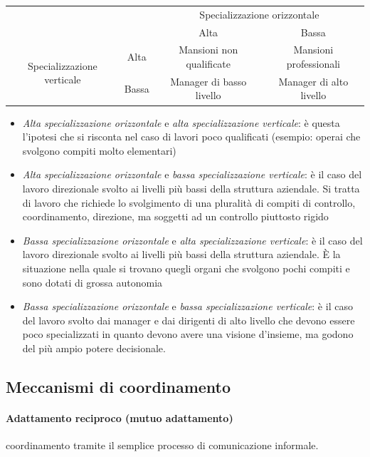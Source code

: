 \begin{table}[h]
	\begin{tabular}{cc|c|c|}
		\cline{3-4}
		&       & \multicolumn{2}{c|}{Specializzazione orizzontale}  \\ \cline{3-4} 
		&       & Alta                     & Bassa                   \\ \hline
		\multicolumn{1}{|c|}{\multirow{2}{*}{Specializzazione verticale}} & Alta  & Mansioni non qualificate & Mansioni professionali  \\ \cline{2-4} 
		\multicolumn{1}{|c|}{}                                            & Bassa & Manager di basso livello & Manager di alto livello \\ \hline
	\end{tabular}
\end{table}
\begin{itemize}
	\item \emph{Alta specializzazione orizzontale} e \emph{alta specializzazione verticale}:
	è questa l’ipotesi che si risconta nel caso di lavori poco qualificati
	(esempio: operai che svolgono compiti molto elementari)
	
	\item \emph{Alta specializzazione orizzontale} e \emph{bassa specializzazione
	verticale}: è il caso del lavoro direzionale svolto ai livelli più bassi della
	struttura aziendale. Si tratta di
	lavoro che richiede lo svolgimento di una pluralità di compiti di
	controllo, coordinamento, direzione, ma soggetti ad un controllo
	piuttosto rigido
	\item \emph{Bassa specializzazione orizzontale} e \emph{alta specializzazione
	verticale}: è il caso del lavoro direzionale svolto ai livelli più bassi della
	struttura aziendale. È la situazione nella quale si trovano quegli
	organi che svolgono pochi compiti e sono dotati di grossa autonomia
	\item \emph{Bassa specializzazione orizzontale} e \emph{bassa specializzazione
	verticale}: è il caso del lavoro svolto dai manager e dai dirigenti di alto
	livello che devono essere poco specializzati in quanto devono avere
	una visione d’insieme, ma godono del più ampio potere decisionale.
\end{itemize}

\subsection{Meccanismi di coordinamento}
\paragraph{Adattamento reciproco (mutuo adattamento)}
coordinamento tramite il semplice processo di comunicazione informale.

